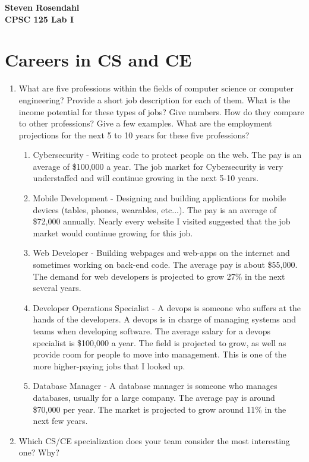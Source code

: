 \documentclass{hw}
\begin{document}
\noindent\textbf{Steven Rosendahl}\\
\noindent\textbf{CPSC 125 Lab I}\\
\section*{Careers in CS and CE}
\begin{enumerate}
\item What are five professions within the fields of computer science or computer engineering? Provide a short job description for each of them. What is the income potential for these types of jobs? Give numbers. How do they compare to other professions? Give a few examples. What are the employment projections for the next 5 to 10 years for these five professions?
\begin{enumerate}
\item Cybersecurity - Writing code to protect people on the web. The pay is an average of \$100,000 a year. The job market for Cybersecurity is very understaffed and will continue growing in the next 5-10 years.
\item Mobile Development - Designing and building applications for mobile devices (tables, phones, wearables, etc...). The pay is an average of \$72,000 annually. Nearly every website I visited suggested that the job market would continue growing for this job.
\item Web Developer - Building webpages and web-apps on the internet and sometimes working on back-end code. The average pay is about \$55,000. The demand for web developers is projected to grow 27\% in the next several years.
\item Developer Operations Specialist - A devops is someone who suffers at the hands of the developers. A devops is in charge of managing systems and teams when developing software. The average salary for a devops specialist is \$100,000 a year. The field is projected to grow, as well as provide room for people to move into management. This is one of the more higher-paying jobs that I looked up.
\item Database Manager - A database manager is someone who manages databases, usually for a large company. The average pay is around \$70,000 per year. The market is projected to grow around 11\% in the next few years.
\end{enumerate}
\item Which CS/CE specialization does your team consider the most interesting one? Why?
\begin{quote}

\end{quote}
\end{enumerate}
\end{document}

